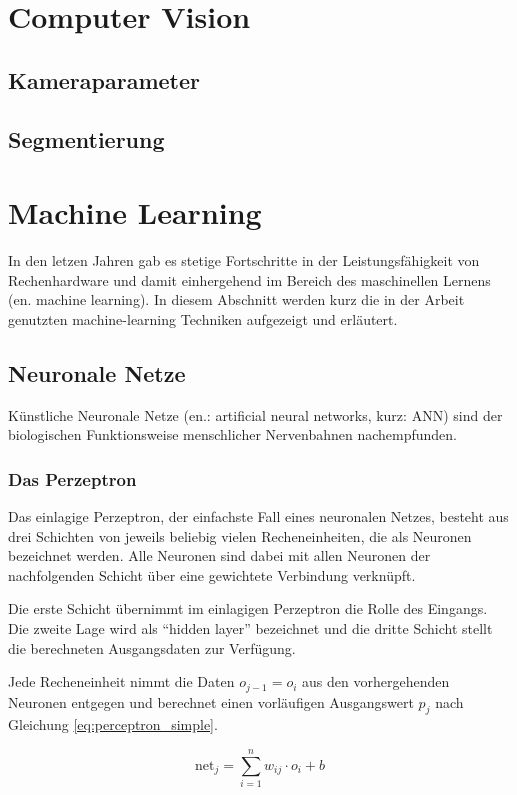 \section { Computer Vision }
	\subsection { Kameraparameter }
	\subsection { Segmentierung }
		

	
\section { Machine Learning }
	In den letzen Jahren gab es stetige Fortschritte in der Leistungsfähigkeit von Rechenhardware und damit einhergehend im Bereich des maschinellen Lernens (en. machine learning).
	In diesem Abschnitt werden kurz die in der Arbeit genutzten machine-learning Techniken aufgezeigt und erläutert.
	
	\subsection { Neuronale Netze }
	Künstliche Neuronale Netze (en.: artificial neural networks, kurz: ANN) sind der biologischen Funktionsweise menschlicher Nervenbahnen nachempfunden. 
	
		\subsubsection { Das Perzeptron }
		Das einlagige Perzeptron, der einfachste Fall eines neuronalen Netzes, besteht aus drei Schichten von jeweils beliebig vielen Recheneinheiten, die als Neuronen bezeichnet werden. Alle Neuronen sind dabei mit allen Neuronen der nachfolgenden Schicht über eine gewichtete Verbindung verknüpft. 
		
		Die erste Schicht übernimmt im einlagigen Perzeptron die Rolle des Eingangs. Die zweite Lage wird als "`hidden layer"' bezeichnet und die dritte Schicht stellt die berechneten Ausgangsdaten zur Verfügung.
		
		Jede Recheneinheit nimmt die Daten $o_{j-1} = o_i$ aus den vorhergehenden Neuronen entgegen und berechnet einen vorläufigen Ausgangswert $p_j$ nach Gleichung \ref{eq:perceptron_simple}. 
		
		\begin{equation}
			\label{eq:perceptron_simple}
			\text{net}_j = \sum_{i=1}^{n} w_{ij} \cdot o_i + b
		\end{equation}
		
